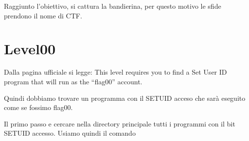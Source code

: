 Raggiunto l'obiettivo, si cattura la bandierina, per questo motivo le sfide prendono il nome di CTF.

\section{Level00}
Dalla pagina ufficiale si legge:
This level requires you to find a Set User ID program that will run as the “flag00” account.

Quindi dobbiamo trovare un programma con il SETUID acceso che sarà eseguito come se fossimo flag00.

Il primo passo e cercare nella directory principale tutti i programmi con il bit SETUID accesso. Usiamo quindi il comando \text

